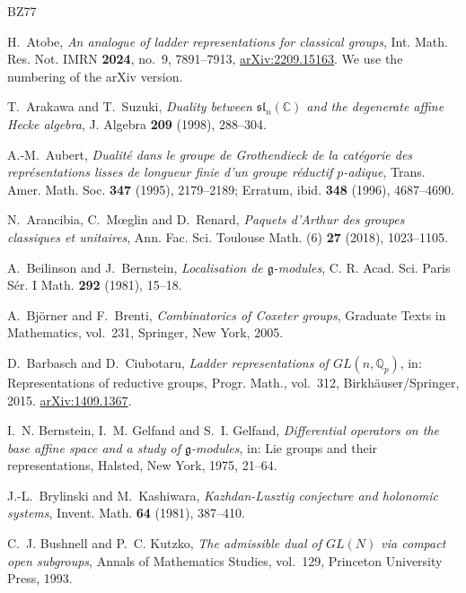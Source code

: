 \documentclass[a4paper,12pt,leqno]{amsart}
\theoremstyle{plain}
\theoremstyle{definition}
\theoremstyle{definition}
\begin{document}
\begin{thebibliography}{BZ77}

 H.~Atobe, \emph{An analogue of ladder representations for classical groups},
Int. Math. Res. Not. IMRN \textbf{2024}, no.~9, 7891--7913, \href{https://arxiv.org/abs/2209.15163}{arXiv:2209.15163}. We use the numbering of the arXiv version.

 T.~Arakawa and T.~Suzuki, \emph{Duality between $\mathfrak{sl}_n(\mathbb{C})$
and the degenerate affine Hecke algebra}, J. Algebra \textbf{209} (1998), 288--304.

 A.-M.~Aubert, \emph{Dualit\'e dans le groupe de Grothendieck de la
cat\'egorie des repr\'esentations lisses de longueur finie d'un groupe r\'eductif $p$-adique},
Trans. Amer. Math. Soc. \textbf{347} (1995), 2179--2189; Erratum, ibid. \textbf{348} (1996), 4687--4690.

 N.~Arancibia, C.~M\oe glin and D.~Renard, \emph{Paquets d'Arthur des groupes
classiques et unitaires}, Ann. Fac. Sci. Toulouse Math. (6) \textbf{27} (2018), 1023--1105.

 A.~Beilinson and J.~Bernstein, \emph{Localisation de $\mathfrak{g}$-modules},
C. R. Acad. Sci. Paris S\'er. I Math. \textbf{292} (1981), 15--18.

 A.~Bj\"orner and F.~Brenti, \emph{Combinatorics of Coxeter groups}, Graduate
Texts in Mathematics, vol.~231, Springer, New York, 2005.

 D.~Barbasch and D.~Ciubotaru, \emph{Ladder representations of
$GL(n,\mathbb{Q}_p)$}, in: Representations of reductive groups, Progr. Math., vol.~312,
Birkh\"auser/Springer, 2015. \href{https://arxiv.org/abs/1409.1367}{arXiv:1409.1367}.

 I.~N. Bernstein, I.~M. Gelfand and S.~I. Gelfand, \emph{Differential operators on
the base affine space and a study of $\mathfrak{g}$-modules}, in: Lie groups and their representations,
Halsted, New York, 1975, 21--64.

 J.-L.~Brylinski and M.~Kashiwara, \emph{Kazhdan-Lusztig conjecture and
holonomic systems}, Invent. Math. \textbf{64} (1981), 387--410.

 C.~J. Bushnell and P.~C. Kutzko, \emph{The admissible dual of $GL(N)$ via
compact open subgroups}, Annals of Mathematics Studies, vol.~129, Princeton University Press, 1993.


\end{thebibliography}
\end{document}
